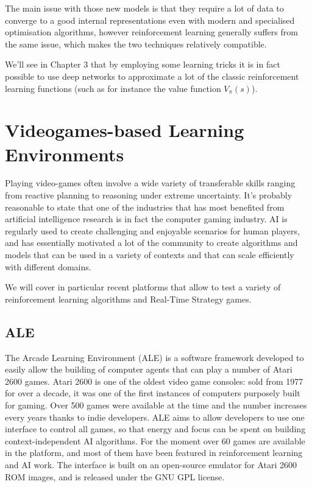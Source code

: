 The main issue with those new models is that they require a lot of data to
converge to a good internal representations even with modern and specialised
optimisation algorithms, however reinforcement learning generally suffers from
the same issue, which makes the two techniques relatively compatible.

We'll see in Chapter 3 that by employing some learning tricks it is in fact
possible to use deep networks to approximate a lot of the classic reinforcement
learning functions (such as for instance the value function $V_{\pi}(s)$).

\section{Videogames-based Learning Environments}

Playing video-games often involve a wide variety of transferable skills ranging
from reactive planning to reasoning under extreme uncertainty. It's probably
reasonable to state that one of the industries that has most benefited from
artificial intelligence research is in fact the computer gaming industry. AI is
regularly used to create challenging and enjoyable scenarios for human players,
and has essentially motivated a lot of the community to create algorithms and
models that can be used in a variety of contexts and that can scale efficiently
with different domains.

We will cover in particular recent platforms that allow to test a variety of
reinforcement learning algorithms and Real-Time Strategy games.


\subsection{ALE}

The Arcade Learning Environment (ALE) is a software framework developed to
easily allow the building of computer agents that can play a number of Atari
2600 games. Atari 2600 is one of the oldest video game consoles: sold from 1977
for over a decade, it was one of the first instances of computers purposely
built for gaming. Over 500 games were available at the time and the number
increases every years thanks to indie developers. ALE aims to allow developers
to use one interface to control all games, so that energy and focus can be spent
on building context-independent AI algorithms. For the moment over 60 games are
available in the platform, and most of them have been featured in reinforcement
learning and AI work. The interface is built on an open-source emulator for
Atari 2600 ROM images, and is released under the GNU GPL license.

